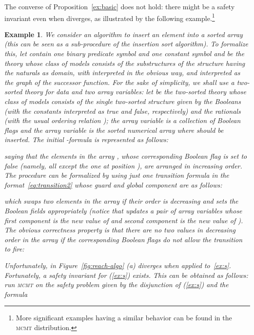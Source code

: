 \documentclass{LMCS}
\theoremstyle{plain}\newtheorem{assumption}[thm]{Assumption}
\theoremstyle{plain}\newtheorem{proposition}[thm]{Proposition}
\theoremstyle{plain}\newtheorem{property}[thm]{Property}
\theoremstyle{plain}\newtheorem{example}[thm]{Example}
\theoremstyle{plain}\newtheorem{claim}[thm]{Claim}
\theoremstyle{plain}\newtheorem{lemma}[thm]{Lemma}
\begin{document}
The converse of Proposition~\ref{ex:basic} does not hold: there might
be a safety invariant even when  diverges, as
illustrated by the following example.\footnote{More significant
  examples having a similar behavior can be found in the \textsc{mcmt}
  distribution.}
\begin{example}\em
  \label{ex:only}
  We consider an algorithm to insert an element  into a sorted
  array  (this can be seen as a sub-procedure of
  the insertion sort algorithm).  To formalize this, let 
  contain one binary predicate symbol  and one constant symbol 
  and  be the theory whose class of models consists of the
  substructures of the structure having the naturals as domain, with
   interpreted in the obvious way, and  interpreted as the graph
  of the successor function.  For the sake of simplicity, we shall use
  a two-sorted theory for data and two array variables: let  be
  the two-sorted theory whose class of models consists of the single
  two-sorted structure given by the Booleans (with the constants
   interpreted as true and false, respectively) and the
  rationals (with the usual ordering relation ); the array variable
   is a collection of Boolean flags and the array variable  is
  the sorted numerical array where  should be inserted.  The
  initial -formula is represented as follows:
  
  saying that the elements in the array , whose corresponding
  Boolean flag is set to false (namely, all except the one at position
  ), are arranged in increasing order.  The procedure can be
  formalized by using just one transition formula in the
  format~\ref{eq:transition2} whose guard and global component are as
  follows:
  
  which swaps two elements in the array  if their order is
  decreasing and sets the Boolean fields appropriately (notice that
   updates a pair of array variables whose first component is the
  new value of  and second component is the new value of ).  The
  obvious correctness property is that there are no two values in
  decreasing order in the array  if the corresponding Boolean flags
  do not allow the transition to fire:
  
  Unfortunately,  in Figure~\ref{fig:reach-algo} (a)
  diverges when applied to~\eqref{ex:s}.  Fortunately, a safety
  invariant for (\ref{ex:s}) exists.  This can be obtained as follows:
  run \textsc{mcmt} on the safety problem given by the disjunction of
  (\ref{ex:s}) and the formula
  

\end{example}
\end{document}

